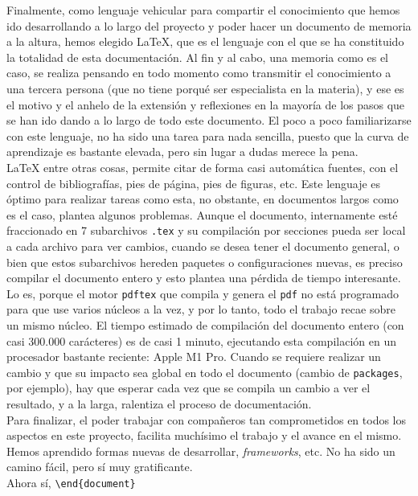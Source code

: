 \documentclass[../ei103948-project-documentation.tex]{subfiles}
\begin{document}
        Finalmente, como lenguaje vehicular para compartir el conocimiento que hemos ido desarrollando a lo largo del proyecto y poder hacer un documento de memoria a la altura, hemos elegido \LaTeX{}, que es el lenguaje con el que se ha constituido la totalidad de esta documentación. Al fin y al cabo, una memoria como es el caso, se realiza pensando en todo momento como transmitir el conocimiento a una tercera persona (que no tiene porqué ser especialista en la materia), y ese es el motivo y el anhelo de la extensión y reflexiones en la mayoría de los pasos que se han ido dando a lo largo de todo este documento. El poco a poco familiarizarse con este lenguaje, no ha sido una tarea para nada sencilla, puesto que la curva de aprendizaje es bastante elevada, pero sin lugar a dudas merece la pena.\\

        \LaTeX{} entre otras cosas, permite citar de forma casi automática fuentes, con el control de bibliografías, pies de página, pies de figuras, etc. Este lenguaje es óptimo para realizar tareas como esta, no obstante, en documentos largos como es el caso, plantea algunos problemas. Aunque el documento, internamente esté fraccionado en 7 subarchivos \texttt{.tex} y su compilación por secciones pueda ser local a cada archivo para ver cambios, cuando se desea tener el documento general, o bien que estos subarchivos hereden paquetes o configuraciones nuevas, es preciso compilar el documento entero y esto plantea una pérdida de tiempo interesante. Lo es, porque el motor \texttt{pdftex} que compila y genera el \texttt{pdf} no está programado para que use varios núcleos a la vez, y por lo tanto, todo el trabajo recae sobre un mismo núcleo. El tiempo estimado de compilación del documento entero (con casi 300.000 carácteres) es de casi 1 minuto, ejecutando esta compilación en un procesador bastante reciente: Apple M1 Pro. Cuando se requiere realizar un cambio y que su impacto sea global en todo el documento (cambio de \texttt{packages}, por ejemplo), hay que esperar cada vez que se compila un cambio a ver el resultado, y a la larga, ralentiza el proceso de documentación.\\

        Para finalizar, el poder trabajar con compañeros tan comprometidos en todos los aspectos en este proyecto, facilita muchísimo el trabajo y el avance en el mismo. Hemos aprendido formas nuevas de desarrollar, \textit{frameworks}, etc. No ha sido un camino fácil, pero sí muy gratificante.\\

        Ahora sí, \texttt{\textbackslash{}end\{document\}}

    
\end{document}
